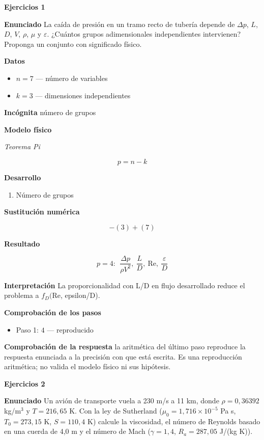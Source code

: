 \documentclass[10pt,openany]{book}
\begin{document}
\noindent\textbf{Ejercicios 1}

\noindent\textbf{Enunciado}
La caída de presión en un tramo recto de tubería depende de \(\Delta p\), \(L\), \(D\), \(V\), \(\rho\), \(\mu\) y \(\varepsilon\). ¿Cuántos grupos adimensionales independientes intervienen? Proponga un conjunto con significado físico.

\noindent\textbf{Datos}
\begin{itemize}
\item $n = 7$ — número de variables
\item $k = 3$ — dimensiones independientes
\end{itemize}

\noindent\textbf{Incógnita}
número de grupos

\noindent\textbf{Modelo físico}

\noindent\textit{Teorema Pi}

\[
p = n - k
\]

\noindent\textbf{Desarrollo}
\begin{enumerate}
\item
Número de grupos
\end{enumerate}

\noindent\textbf{Sustitución numérica}

\[
- \left(3\right) + \left(7\right)
\]

\noindent\textbf{Resultado}

\[
p = 4:\ \ \frac{\Delta p}{\rho V^{2}},\ \frac{L}{D},\ \mathrm{Re},\ \frac{\varepsilon}{D}
\]

\noindent\textbf{Interpretación}
La proporcionalidad con L/D en flujo desarrollado reduce el problema a \(f_D(\)Re, epsilon/D).

\noindent\textbf{Comprobación de los pasos}
\begin{itemize}
\item Paso 1: $4$ — reproducido
\end{itemize}

\noindent\textbf{Comprobación de la respuesta} la aritmética del último paso reproduce la respuesta enunciada a la precisión con que está escrita. Es una reproducción aritmética; no valida el modelo físico ni sus hipótesis.

\noindent\textbf{Ejercicios 2}

\noindent\textbf{Enunciado}
Un avión de transporte vuela a 230 m/s a 11 km, donde \(\rho = 0{,}36392\) kg/m\(^3\) y \(T = 216{,}65\) K. Con la ley de Sutherland (\(\mu_0 = 1{,}716\times 10^{-5}\) Pa s, \(T_0 = 273{,}15\) K, \(S = 110{,}4\) K) calcule la viscosidad, el número de Reynolds basado en una cuerda de 4,0 m y el número de Mach (\(\gamma = 1{,}4\), \(R_a = 287{,}05\) J/(kg K)).
\end{document}
